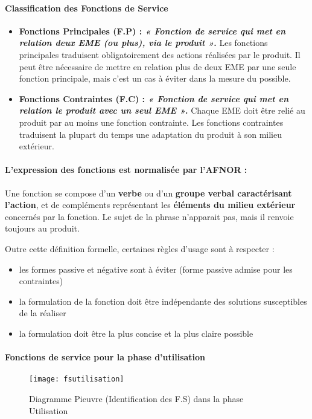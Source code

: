 \paragraph{Classification des Fonctions de Service}
\begin{itemize}
    \item \textbf{Fonctions Principales (F.P) : \textit{« Fonction de service qui met en relation deux EME (ou plus), via le produit »}.} Les fonctions principales traduisent obligatoirement des actions réalisées par le produit. Il peut être nécessaire de mettre en relation plus de deux EME par une seule fonction principale, mais c’est un cas à éviter dans la mesure du possible.
    \item \textbf{Fonctions Contraintes (F.C) : \textit{« Fonction de service qui met en relation le produit avec un seul EME »}.} Chaque EME doit être relié au produit par au moins une fonction contrainte. Les fonctions contraintes traduisent la plupart du temps une adaptation du produit à son milieu
    extérieur.
\end{itemize}

\paragraph{L’expression des fonctions est normalisée par l’AFNOR :} Une fonction se compose d'un \textbf{verbe} ou d'un \textbf{groupe verbal caractérisant l'action}, et de compléments représentant les \textbf{éléments du milieu extérieur} concernés par la fonction. Le sujet de la phrase n'apparait pas, mais il renvoie toujours au produit.

Outre cette définition formelle, certaines règles d'usage sont à respecter :
\begin{itemize}
    \item les formes passive et négative sont à éviter (forme passive admise pour les contraintes)
    \item la formulation de la fonction doit être indépendante des solutions susceptibles de la réaliser
    \item la formulation doit être la plus concise et la plus claire possible
\end{itemize}


\paragraph{Fonctions de service pour la phase d'utilisation}

\begin{figure}[H]
    \centering
    \texttt{[image: fsutilisation]}
    \caption{Diagramme Pieuvre (Identification des F.S) dans la phase Utilisation}
    \label{fig:fsutilisation}
\end{figure}

